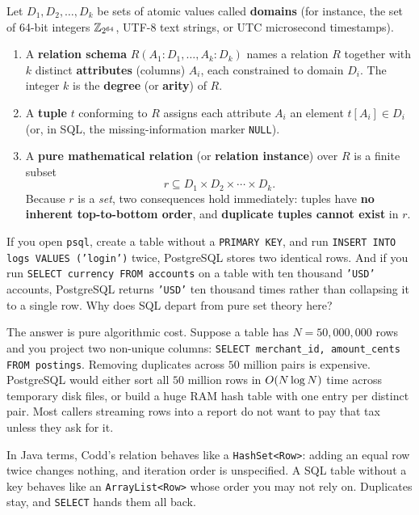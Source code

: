 \begin{formalbox}
Let $D_1, D_2, \dots, D_k$ be sets of atomic values called \textbf{domains} (for instance, the set of 64-bit integers $\mathbb{Z}_{2^{64}}$, UTF-8 text strings, or UTC microsecond timestamps).
\begin{enumerate}
  \item A \textbf{relation schema} $R(A_1 : D_1, \dots, A_k : D_k)$ names a relation $R$ together with $k$ distinct \textbf{attributes} (columns) $A_i$, each constrained to domain $D_i$. The integer $k$ is the \textbf{degree} (or \textbf{arity}) of $R$.
  \item A \textbf{tuple} $t$ conforming to $R$ assigns each attribute $A_i$ an element $t[A_i] \in D_i$ (or, in SQL, the missing-information marker \texttt{NULL}).
  \item A \textbf{pure mathematical relation} (or \textbf{relation instance}) over $R$ is a finite subset
  \[
    r \subseteq D_1 \times D_2 \times \cdots \times D_k.
  \]
  Because $r$ is a \emph{set}, two consequences hold immediately: tuples have \textbf{no inherent top-to-bottom order}, and \textbf{duplicate tuples cannot exist} in $r$.
\end{enumerate}
\end{formalbox}

If you open \texttt{psql}, create a table without a \texttt{PRIMARY KEY}, and run \texttt{INSERT INTO logs VALUES ('login')} twice, PostgreSQL stores two identical rows. And if you run \texttt{SELECT currency FROM accounts} on a table with ten thousand \texttt{'USD'} accounts, PostgreSQL returns \texttt{'USD'} ten thousand times rather than collapsing it to a single row. Why does SQL depart from pure set theory here?

The answer is pure algorithmic cost. Suppose a table has $N = 50{,}000{,}000$ rows and you project two non-unique columns: \texttt{SELECT merchant\_id, amount\_cents FROM postings}. Removing duplicates across $50$ million pairs is expensive. PostgreSQL would either sort all $50$ million rows in $O(N \log N)$ time across temporary disk files, or build a huge RAM hash table with one entry per distinct pair. Most callers streaming rows into a report do not want to pay that tax unless they ask for it.

In Java terms, Codd's relation behaves like a \texttt{HashSet<Row>}: adding an equal row twice changes nothing, and iteration order is unspecified. A SQL table without a key behaves like an \texttt{ArrayList<Row>} whose order you may not rely on. Duplicates stay, and \texttt{SELECT} hands them all back.

